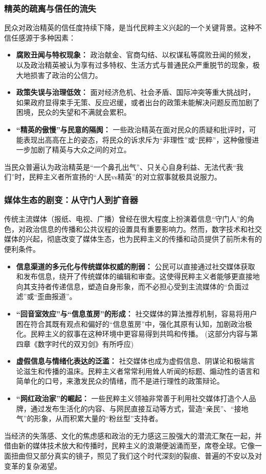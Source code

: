 \documentclass[UTF8, 10pt]{ctexbook}
\begin{document}
\subsubsection{精英的疏离与信任的流失}
民众对政治精英的信任度持续下降，是当代民粹主义兴起的一个关键背景。这种不信任感源于多种因素：
    \begin{itemize}
        \item \textbf{腐败丑闻与特权现象：} 政治献金、官商勾结、以权谋私等腐败丑闻的频发，以及政治精英被认为享有过多特权、生活方式与普通民众严重脱节的现象，极大地损害了政治的公信力。
        \item \textbf{政策失误与治理低效：} 面对经济危机、社会矛盾、国际冲突等重大挑战时，如果政府显得束手无策、反应迟缓，或者出台的政策未能解决问题反而加剧了困境，民众的失望和不满就会累积。
        \item \textbf{“精英的傲慢”与民意的隔阂：} 一些政治精英在面对民众的质疑和批评时，可能表现出高高在上的姿态，将民众的诉求斥为“非理性”或“民粹”，这种傲慢进一步加剧了精英与大众之间的对立。
    \end{itemize}
当民众普遍认为政治精英是“一个鼻孔出气”、只关心自身利益、无法代表“我们”时，民粹主义者所宣扬的“人民vs精英”的对立叙事就极具说服力。

\subsubsection{媒体生态的剧变：从守门人到扩音器}
传统主流媒体（报纸、电视、广播）曾经在很大程度上扮演着信息“守门人”的角色，对政治信息的传播和公共议程的设置具有重要影响力。然而，数字技术和社交媒体的兴起，彻底改变了媒体生态，也为民粹主义的传播和动员提供了前所未有的便利条件。
    \begin{itemize}
        \item \textbf{信息渠道的多元化与传统媒体权威的削弱：} 公民可以直接通过社交媒体获取和发布信息，绕开了传统媒体的编辑和审查。这使得民粹主义者能够更直接地向其支持者传递信息，塑造自身形象，而不必担心受到主流媒体的“负面过滤”或“歪曲报道”。
        \item \textbf{“回音室效应”与“信息茧房”的形成：} 社交媒体的算法推荐机制，容易将用户困在符合其既有观点和偏好的“信息茧房”中，强化其原有认知，加剧政治极化。民粹主义的叙事在这种环境中更容易得到共鸣和传播。 (这部分内容与第四章《数字时代的双刃剑》有所呼应)
        \item \textbf{虚假信息与情绪化表达的泛滥：} 社交媒体也成为虚假信息、阴谋论和极端言论滋生和传播的温床。民粹主义者常常利用耸人听闻的标题、煽动性的语言和简单化的口号，来激发民众的情绪，而不是进行理性的政策辩论。
        \item \textbf{“网红政治家”的崛起：} 一些民粹主义领袖非常善于利用社交媒体打造个人品牌，通过发布生活化的内容、与网民直接互动等方式，营造“亲民”、“接地气”的形象，从而积累大量的“粉丝型”支持者。
    \end{itemize}
当经济的失落感、文化的焦虑感和政治的无力感这三股强大的潜流汇聚在一起，并借由新的媒体技术放大和传播时，民粹主义的浪潮便汹涌而至，席卷全球。它像一面扭曲但又部分真实的镜子，照见了我们这个时代深刻的裂痕、普遍的不安以及对变革的复杂渴望。
\end{document}
